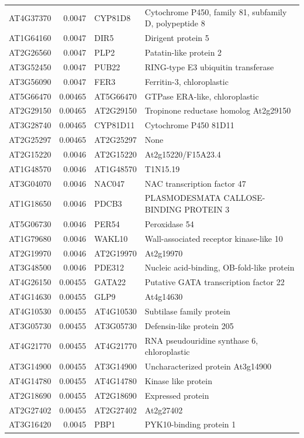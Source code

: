 \documentclass[11pt]{article}
\begin{document}
\begin{center}
\begin{tabular}{lrll}
AT4G37370 & 0.0047 & CYP81D8 & Cytochrome P450, family 81, subfamily D, polypeptide 8\\
AT1G64160 & 0.0047 & DIR5 & Dirigent protein 5\\
AT2G26560 & 0.0047 & PLP2 & Patatin-like protein 2\\
AT3G52450 & 0.0047 & PUB22 & RING-type E3 ubiquitin transferase\\
AT3G56090 & 0.0047 & FER3 & Ferritin-3, chloroplastic\\
AT5G66470 & 0.00465 & AT5G66470 & GTPase ERA-like, chloroplastic\\
AT2G29150 & 0.00465 & AT2G29150 & Tropinone reductase homolog At2g29150\\
AT3G28740 & 0.00465 & CYP81D11 & Cytochrome P450 81D11\\
AT2G25297 & 0.00465 & AT2G25297 & None\\
AT2G15220 & 0.0046 & AT2G15220 & At2g15220/F15A23.4\\
AT1G48570 & 0.0046 & AT1G48570 & T1N15.19\\
AT3G04070 & 0.0046 & NAC047 & NAC transcription factor 47\\
AT1G18650 & 0.0046 & PDCB3 & PLASMODESMATA CALLOSE-BINDING PROTEIN 3\\
AT5G06730 & 0.0046 & PER54 & Peroxidase 54\\
AT1G79680 & 0.0046 & WAKL10 & Wall-associated receptor kinase-like 10\\
AT2G19970 & 0.0046 & AT2G19970 & At2g19970\\
AT3G48500 & 0.0046 & PDE312 & Nucleic acid-binding, OB-fold-like protein\\
AT4G26150 & 0.00455 & GATA22 & Putative GATA transcription factor 22\\
AT4G14630 & 0.00455 & GLP9 & At4g14630\\
AT4G10530 & 0.00455 & AT4G10530 & Subtilase family protein\\
AT3G05730 & 0.00455 & AT3G05730 & Defensin-like protein 205\\
AT4G21770 & 0.00455 & AT4G21770 & RNA pseudouridine synthase 6, chloroplastic\\
AT3G14900 & 0.00455 & AT3G14900 & Uncharacterized protein At3g14900\\
AT4G14780 & 0.00455 & AT4G14780 & Kinase like protein\\
AT2G18690 & 0.00455 & AT2G18690 & Expressed protein\\
AT2G27402 & 0.00455 & AT2G27402 & At2g27402\\
AT3G16420 & 0.0045 & PBP1 & PYK10-binding protein 1\\

\end{tabular}
\end{center}
\end{document}
